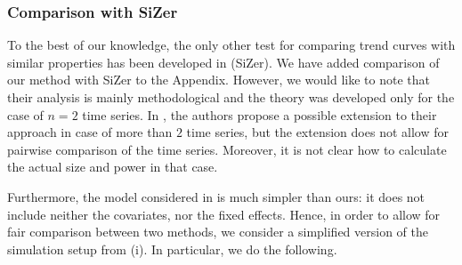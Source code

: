 \documentclass[a4paper,12pt]{article}
\begin{document}


\subsubsection*{Comparison with SiZer} 


 To the best of our knowledge, the only other test for comparing trend curves with similar properties has been developed in \cite{Park2009} (SiZer). We have added comparison of our method with SiZer to the Appendix. However, we would like to note that their analysis is mainly methodological and the theory was developed only for the case of $n=2$ time series. In \cite{Park2009}, the authors propose a possible extension to their approach in case of more than $2$ time series, but the extension does not allow for pairwise comparison of the time series. Moreover, it is not clear how to calculate the actual size and power in that case.

Furthermore, the model considered in \cite{Park2009} is much simpler than ours: it does not include neither the covariates, nor the fixed effects. Hence, in order to allow for fair comparison between two methods, we consider a simplified version of the simulation setup from (i). In particular, we do the following.
\end{document}
